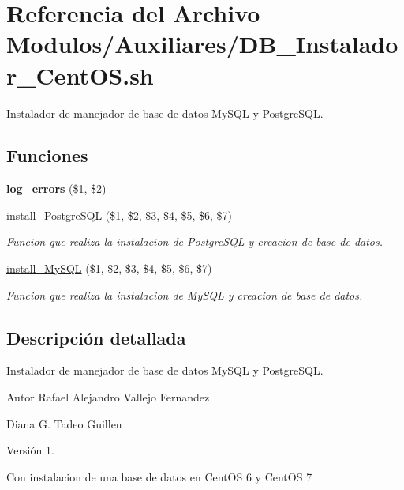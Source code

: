 \hypertarget{DB__Instalador__CentOS_8sh}{}\section{Referencia del Archivo Modulos/\+Auxiliares/\+D\+B\+\_\+\+Instalador\+\_\+\+Cent\+OS.sh}
\label{DB__Instalador__CentOS_8sh}


Instalador de manejador de base de datos My\+S\+QL y Postgre\+S\+QL.  


\subsection*{Funciones}
\begin{DoxyCompactItemize}
\item 
\mbox{\label{DB__Instalador__CentOS_8sh_a92067b58a8478c9841b2cd9b75ea3565}} 
{\bfseries log\+\_\+errors} (\$1, \$2)
\item 
\hyperlink{DB__Instalador__CentOS_8sh_a56ea9a82dabc1a9f02e4d35cec23e802}{install\+\_\+\+Postgre\+S\+QL} (\$1, \$2, \$3, \$4, \$5, \$6, \$7)
\begin{DoxyCompactList}\small\item\em Funcion que realiza la instalacion de Postgre\+S\+QL y creacion de base de datos. \end{DoxyCompactList}\item 
\hyperlink{DB__Instalador__CentOS_8sh_a03e08a874e1024001f9ce25f5d639022}{install\+\_\+\+My\+S\+QL} (\$1, \$2, \$3, \$4, \$5, \$6, \$7)
\begin{DoxyCompactList}\small\item\em Funcion que realiza la instalacion de My\+S\+QL y creacion de base de datos. \end{DoxyCompactList}\end{DoxyCompactItemize}


\subsection{Descripción detallada}
Instalador de manejador de base de datos My\+S\+QL y Postgre\+S\+QL. 

\begin{DoxyAuthor}{Autor}
Rafael Alejandro Vallejo Fernandez 

Diana G. Tadeo Guillen 
\end{DoxyAuthor}
\begin{DoxyVersion}{Versión}
1.
\end{DoxyVersion}
Con instalacion de una base de datos en Cent\+OS 6 y Cent\+OS 7 

